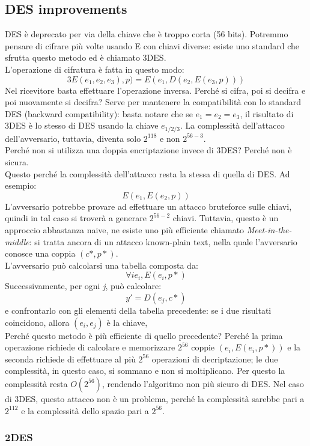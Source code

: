 \documentclass[a4paper,12pt]{article}
\begin{document}
\subsection{DES improvements}
DES è deprecato per via della chiave che è troppo corta (56 bits). Potremmo pensare di cifrare più volte usando E con chiavi diverse: esiste uno standard che sfrutta questo metodo ed è chiamato 3DES.\\
L'operazione di cifratura è fatta in questo modo:
$$3E(e_1, e_2, e_3), p) = E (e_1, D(e_2, E(e_3, p)))$$
Nel ricevitore basta effettuare l'operazione inversa. Perché si cifra, poi si decifra e poi nuovamente si decifra? 
Serve per mantenere la compatibilità con lo standard DES (backward compatibility): basta notare che se $e_1 = e_2 = e_3$, il risultato di 3DES è lo stesso di DES usando la chiave $e_{1/2/3}$.
La complessità dell'attacco dell'avversario, tuttavia, diventa solo $2^{118}$ e non $2^{56-3}$. \\
Perché non si utilizza una doppia encriptazione invece di 3DES? Perché non è sicura. \\
Questo perché la complessità dell'attacco resta la stessa di quella di DES. Ad esempio:
$$E(e_1, E(e_2, p))$$
L'avversario potrebbe provare ad effettuare un attacco bruteforce sulle chiavi, quindi in tal caso si troverà a generare $2^{56-2}$ chiavi.
Tuttavia, questo è un approccio abbastanza naive, ne esiste uno più efficiente chiamato \textit{Meet-in-the-middle}: si tratta ancora di un attacco known-plain text, nella quale l'avversario conosce una coppia $(c*, p*)$. \\
L'avversario può calcolarsi una tabella composta da:
$$\forall i  e_i, E(e_i, p*)$$
Successivamente, per ogni \textit{j}, può calcolare:
$$y' = D(e_j, c*)$$
e confrontarlo con gli elementi della tabella precedente: se i due risultati coincidono, allora $(e_i,e_j)$ è la chiave, \\
Perché questo metodo è più efficiente di quello precedente? Perché la prima operazione richiede di calcolare e memorizzare $2^56$ coppie $(e_i, E(e_i, p*))$
e la seconda richiede di effettuare al più $2^{56}$ operazioni di decriptazione; le due complessità, in questo caso, si sommano e non si moltiplicano. Per questo la complessità resta $O(2^{56})$,
rendendo l'algoritmo non più sicuro di DES. Nel caso di 3DES, questo attacco non è un problema, perché la complessità sarebbe pari a $2^{112}$ e la complessità dello spazio pari a $2^{56}$.

\subsubsection{2DES}
\end{document}
